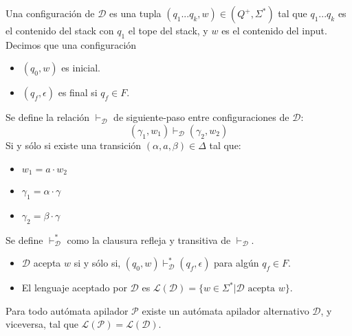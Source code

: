 \documentclass[a4paper,twoside,master.tex]{article}
\begin{document}
\begin{definicion}
    Una configuración de $\mathcal{D}$ es una tupla $(q_1...q_k, w) \in (Q^{+},\Sigma^{*})$ tal que $q_1...q_k$ es el contenido del stack con $q_1$ el tope del stack, y $w$ es el contenido del input.
    Decimos que una configuración
    \begin{itemize}
        \item $(q_0, w)$ es inicial.
        \item $(q_f, \epsilon)$ es final si $q_f \in F$.
    \end{itemize}
\end{definicion}

\begin{definicion}
    Se define la relación $\vdash_\mathcal{D}$ de siguiente-paso entre configuraciones de $\mathcal{D}$:
    $$(\gamma_1, w_1) \vdash_\mathcal{D} (\gamma_2, w_2)$$
    Si y sólo si existe una transición $(\alpha, a, \beta) \in \Delta$ tal que:
    \begin{itemize}
        \item $w_1 = a \cdot w_2$
        \item $\gamma_1 = \alpha \cdot \gamma$
        \item $\gamma_2 = \beta \cdot \gamma$
    \end{itemize}

    Se define $\vdash^*_\mathcal{D}$ como la clausura refleja y transitiva de $\vdash_\mathcal{D}$.
\end{definicion}

\begin{definicion}
    \begin{itemize}
        \item $\mathcal{D}$ acepta $w$ si y sólo si, $(q_0, w) \vdash^*_\mathcal{D} (q_f, \epsilon)$ para algún $q_f \in F$.
        \item El lenguaje aceptado por $\mathcal{D}$ es $\mathcal{L}(\mathcal{D}) = \{ w \in \Sigma^* | \mathcal{D} \text{ acepta } w \}$.
    \end{itemize}
\end{definicion}

\begin{teorema}
    Para todo autómata apilador $\mathcal{P}$ existe un autómata apilador alternativo $\mathcal{D}$, y viceversa, tal que $\mathcal{L}(\mathcal{P}) = \mathcal{L}(\mathcal{D})$.
\end{teorema}
\end{document}
